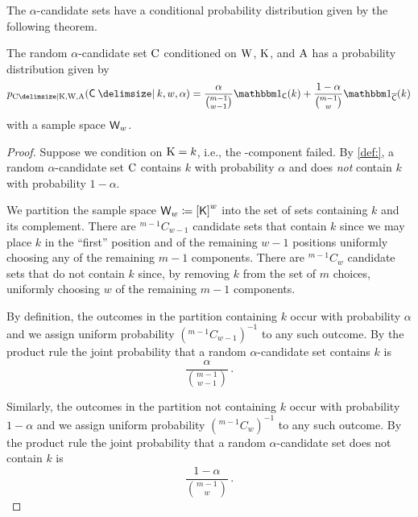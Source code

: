 \documentclass[
    11pt,
    extrafontsizes,
    article,
    oldfontcommands,
    final,
    oneside,
    openany,
    hidelinks]{memoir}
\begin{document}
The $\alpha$-candidate sets have a conditional probability distribution given by the following theorem.
\begin{theorem}
The random $\alpha$-candidate set $\mathrm{C}$ conditioned on $\mathrm{W}$, $\mathrm{K}$, and $\mathrm{A}$ has a probability distribution given by
\begin{equation}
\label{eq:rvcand_given_k_w_a}
	\pmf_{\rvcand \Given \RV{K}, \RV{W}, \RV{A}}(\cand \Given k, w, \alpha) = \frac{\alpha}{\binom{m-1}{w-1}} \SetIndicator{\cand}(k) + \frac{1-\alpha}{\binom{m-1}{w}} \SetIndicator{\SetComplement[\cand]}(k)
\end{equation}
with a sample space $\candsw{w}$.
\end{theorem}
\begin{proof}
	Suppose we condition on $\mathrm{K}=k$, i.e., the \kth-component failed.
	By \cref{def:}, a random $\alpha$-candidate set $\mathrm{C}$ contains $k$ with probability $\alpha$ and does \emph{not} contain $k$ with probability $1-\alpha$.	
	
	We partition the sample space $\candsw{w} \coloneqq \left[\Set{K}\right]^w$ into the set of sets containing $k$ and its complement.
	There are $^{m-1}C_{w-1}$ candidate sets that contain $k$ since we may place $k$ in the ``first'' position and of the remaining $w-1$ positions uniformly choosing any of the remaining $m-1$ components.
	There are $^{m-1}C_w$ candidate sets that do not contain $k$ since, by removing $k$ from the set of $m$ choices, uniformly choosing $w$ of the remaining $m-1$ components.

	By definition, the outcomes in the partition containing $k$ occur with probability $\alpha$ and we assign uniform probability $(^{m-1}C_{w-1})^{-1}$ to any such outcome.
	By the product rule the joint probability that a random $\alpha$-candidate set contains $k$ is
	\begin{equation}
		\frac{\alpha}{\binom{m-1}{w-1}}\,.
	\end{equation}
	
	Similarly, the outcomes in the partition not containing $k$ occur with probability $1-\alpha$ and we assign uniform probability $(^{m-1}C_w)^{-1}$ to any such outcome.
	By the product rule the joint probability that a random $\alpha$-candidate set does not contain $k$ is
	\begin{equation}
		\frac{1-\alpha}{\binom{m-1}{w}}\,.
	\end{equation}
\end{proof}
\end{document}
